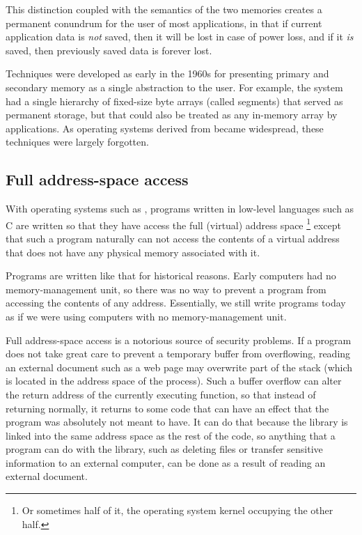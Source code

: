 This distinction coupled with the semantics of the two memories
creates a permanent conundrum for the user of most applications, in
that if current application data is \emph{not} saved, then it will
be lost in case of power loss, and if it \emph{is} saved, then
previously saved data is forever lost. 

Techniques were developed as early in the 1960s for presenting
primary and secondary memory as a single abstraction to the user.
For example, the \multics{} system had a single hierarchy of fixed-size
byte arrays (called segments) that served as permanent storage, but
that could also be treated as any in-memory array by applications.
As operating systems derived from \unix{} became widespread, these
techniques were largely forgotten. 

\subsection{Full address-space access}

With operating systems such as \unix{}, programs written in low-level
languages such as C are written so that they have access the full
(virtual) address space%
\footnote{Or sometimes half of it, the operating system kernel
  occupying the other half.}
except that such a program naturally can not access the contents of a
virtual address that does not have any physical memory associated with
it.

Programs are written like that for historical reasons.  Early
computers had no memory-management unit, so there was no way to
prevent a program from accessing the contents of any address.
Essentially, we still write programs today as if we were using
computers with no memory-management unit.

Full address-space access is a notorious source of security problems.
If a program does not take great care to prevent a temporary buffer
from overflowing, reading an external document such as a web page may
overwrite part of the stack (which is located in the address space of
the process).  Such a buffer overflow can alter the return address of
the currently executing function, so that instead of returning
normally, it returns to some code that can have an effect that the
program was absolutely not meant to have.  It can do that because the
\clanguage{} library is linked into the same address space as the rest
of the code, so anything that a program can do with the \clanguage{}
library, such as deleting files or transfer sensitive information to
an external computer, can be done as a result of reading an external
document.

